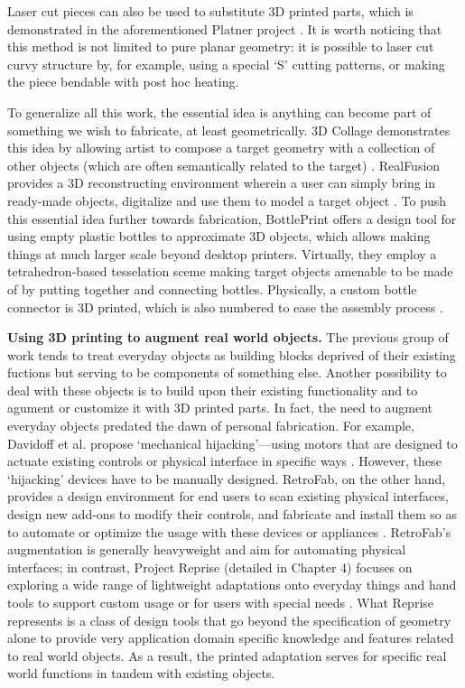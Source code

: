 Laser cut pieces can also be used to substitute 3D printed parts, which is demonstrated in the aforementioned Platner project  \cite{beyer2015platener}. It is worth noticing that this method is not limited to pure planar geometry: it is possible to laser cut curvy structure by, for example, using a special `S' cutting patterns, or making the piece bendable with post hoc heating.

To generalize all this work, the essential idea is anything can become part of something we wish to fabricate, at least geometrically. 3D Collage demonstrates this idea by allowing artist to compose a target geometry with a collection of other objects (which are often semantically related to the target) \cite{gal20073d}. RealFusion provides a 3D reconstructing environment wherein a user can simply bring in ready-made objects, digitalize and use them to model a target object \cite{piya2016}. To push this essential idea further towards fabrication, BottlePrint offers a design tool for using empty plastic bottles to approximate 3D objects, which allows making things at much larger scale beyond desktop printers. Virtually, they employ a tetrahedron-based tesselation sceme making target objects amenable to be made of by putting together and connecting bottles. Physically, a custom bottle connector is 3D printed, which is also numbered to ease the assembly process \cite{robertkovacs2016}.

\textbf{Using 3D printing to augment real world objects.} The previous group of work tends to treat everyday objects as building blocks deprived of their existing fuctions but serving to be components of something else. Another possibility to deal with these objects is to build upon their existing functionality and to agument or customize it with 3D printed parts. In fact, the need to augment everyday objects predated the dawn of personal fabrication. For example, Davidoff et al. propose `mechanical hijacking'---using motors that are designed to actuate existing controls or physical interface in specific ways \cite{davidoff2011mechanical}. However, these `hijacking' devices have to be manually designed. RetroFab, on the other hand, provides a design environment for end users to scan existing physical interfaces, design new add-ons to modify their controls, and fabricate and install them so as to automate or optimize the usage with these devices or appliances \cite{ramakers2016retrofab}. RetroFab's augmentation is generally heavyweight and aim for automating physical interfaces; in contrast, Project Reprise (detailed in Chapter 4) focuses on exploring a wide range of lightweight adaptations onto everyday things and hand tools to support custom usage or for users with special needs \cite{chen2016reprise}. What Reprise represents is a class of design tools that go beyond the specification of geometry alone to provide very application domain specific knowledge and features related to real world objects. As a result, the printed adaptation serves for specific real world functions in tandem with existing objects.

